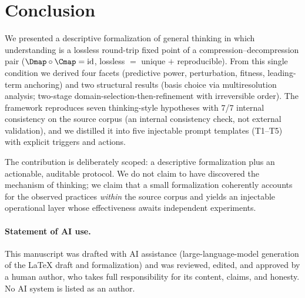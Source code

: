 \section{Conclusion}
\label{sec:conclusion}

We presented a descriptive formalization of general thinking in which
understanding is a lossless round-trip fixed point of a compression--decompression
pair ($\Dmap\circ\Cmap=\mathrm{id}$, lossless $=$ unique $+$ reproducible). From
this single condition we derived four facets (predictive power, perturbation,
fitness, leading-term anchoring) and two structural results (basis choice via
multiresolution analysis; two-stage domain-selection-then-refinement with
irreversible order). The framework reproduces seven thinking-style hypotheses
with 7/7 internal consistency on the source corpus (an internal consistency
check, not external validation), and we distilled it into five injectable prompt
templates (T1--T5) with explicit triggers and actions.

The contribution is deliberately scoped: a descriptive formalization plus an
actionable, auditable protocol. We do not claim to have discovered the mechanism
of thinking; we claim that a small formalization coherently accounts for the
observed practices \emph{within} the source corpus and yields an injectable
operational layer whose effectiveness awaits independent experiments.

\paragraph{Statement of AI use.}
This manuscript was drafted with AI assistance (large-language-model generation
of the LaTeX draft and formalization) and was reviewed, edited, and approved by
a human author, who takes full responsibility for its content, claims, and
honesty. No AI system is listed as an author.
